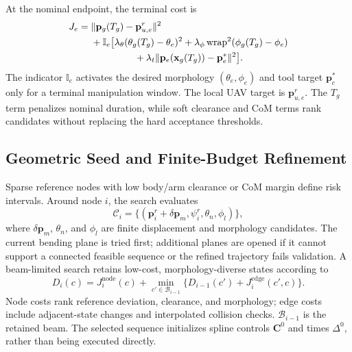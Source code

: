 \documentclass[journal,twoside]{IEEEtran}
\newcommand{\wrap}{\operatorname{wrap}}
\begin{document}
At the nominal endpoint, the terminal cost is
\begin{equation}
\begin{aligned}
J_e={}&\|\mathbf p_g(T_g)-\mathbf p_{u,e}^r\|^2\\
&+\mathbb I_e\big[\lambda_\theta(\theta_g(T_g)-\theta_e)^2
+\lambda_\phi\wrap^2(\phi_g(T_g)-\phi_e)\\
&\hspace{16mm}+\lambda_t\|\mathbf p_e(\mathbf x_g(T_g))-\mathbf p_e^*\|^2\big].
\label{eq:terminal}
\end{aligned}
\end{equation}
The indicator $\mathbb I_e$ activates the desired morphology $(\theta_e,\phi_e)$ and tool target $\mathbf p_e^*$ only for a terminal manipulation window. The local UAV target is $\mathbf p_{u,e}^r$. The $T_g$ term penalizes nominal duration, while soft clearance and CoM terms rank candidates without replacing the hard acceptance thresholds.

\subsection{Geometric Seed and Finite-Budget Refinement}
Sparse reference nodes with low body/arm clearance or CoM margin define risk intervals. Around node $i$, the search evaluates
\begin{equation}
\mathcal C_i=\{(\mathbf p_i^r+\delta\mathbf p_m,\psi_i^r,\theta_n,\phi_l)\},
\label{eq:candidates}
\end{equation}
where $\delta\mathbf p_m$, $\theta_n$, and $\phi_l$ are finite displacement and morphology candidates. The current bending plane is tried first; additional planes are opened if it cannot support a connected feasible sequence or the refined trajectory fails validation. A beam-limited search retains low-cost, morphology-diverse states according to
\begin{equation}
D_i(c)=J_i^{\mathrm{node}}(c)+\min_{c'\in\mathcal B_{i-1}}
\{D_{i-1}(c')+J_i^{\mathrm{edge}}(c',c)\}.
\label{eq:beam}
\end{equation}
Node costs rank reference deviation, clearance, and morphology; edge costs include adjacent-state changes and interpolated collision checks. $\mathcal B_{i-1}$ is the retained beam. The selected sequence initializes spline controls $\mathbf C^0$ and times $\Delta^0$, rather than being executed directly.
\end{document}
